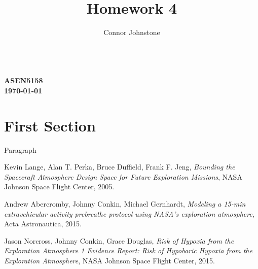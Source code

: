 \documentclass{article}
\renewcommand{\maketitle}{\hspace{-22px}  \textbf{{\theauthor} \\
ASEN5158 \\
\today \\
{\thetitle}} \titlerule}
\begin{document}
  \title{Homework 4}
  \author{Connor Johnstone}

  \maketitle


  \section{First Section}
  Paragraph

\begin{thebibliography}{9}

    Kevin Lange, Alan T. Perka, Bruce Duffield, Frank F. Jeng,
    \textit{Bounding the Spacecraft Atmosphere Design Space for Future Exploration Missions},
    NASA Johnson Space Flight Center,
    2005.

    Andrew Abercromby, Johnny Conkin, Michael Gernhardt,
    \textit{Modeling a 15-min extravehicular activity prebreathe protocol using NASA's exploration atmosphere},
    Acta Astronautica,
    2015.

    Jason Norcross, Johnny Conkin, Grace Douglas,
    \textit{Risk of Hypoxia from the Exploration Atmosphere 1 Evidence Report: Risk of Hypobaric Hypoxia from the Exploration Atmosphere},
    NASA Johnson Space Flight Center,
    2015.

\end{thebibliography}
\end{document}
